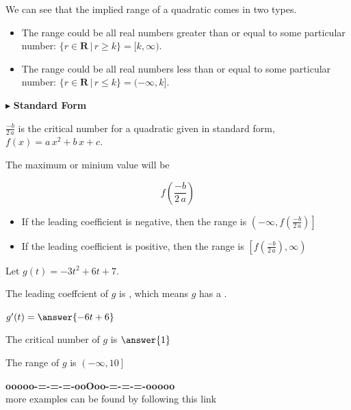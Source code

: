 \documentclass{ximera}
\begin{document}
We can see that the implied range of a quadratic comes in two types.  

\begin{itemize}
\item The range could be all real numbers greater than or equal to some particular number:  $\{ r \in \textbf{R} \, | \, r \geq k \} = [k, \infty)$.
\item The range could be all real numbers less than or equal to some particular number:  $\{ r \in \textbf{R} \, | \, r \leq k \} = (-\infty, k]$.
\end{itemize}






$\blacktriangleright$  \textbf{Standard Form} 

$\frac{-b}{2 \, a}$ is the critical number for a quadratic given in standard form, $f(x) = a \, x^2 + b \, x + c$. 

The maximum or minium value will be 

\[
f\left( \frac{-b}{2 \, a} \right)
\]

\begin{itemize}
     \item If the leading coefficient is negative, then the range is $\left(-\infty, f\left( \frac{-b}{2 \, a} \right)\right]$ \\
     \item If the leading coefficient is positive, then the range is $\left[f\left( \frac{-b}{2 \, a} \right), \infty \right)$ 
\end{itemize}






\begin{question} 


Let $g(t) = -3 t^2 + 6 t + 7$.



The leading coeffcient of $g$ is , which means $g$ has a .



$g'(t) = \answer{-6t+6}$



The critical number of $g$ is $\answer{1}$




The range of $g$ is $\left( -\infty, 10 \right]$


\end{question}









\begin{center}
\textbf{\textcolor{green!50!black}{ooooo-=-=-=-ooOoo-=-=-=-ooooo}} \\

more examples can be found by following this link\\ 

\end{center}
\end{document}
